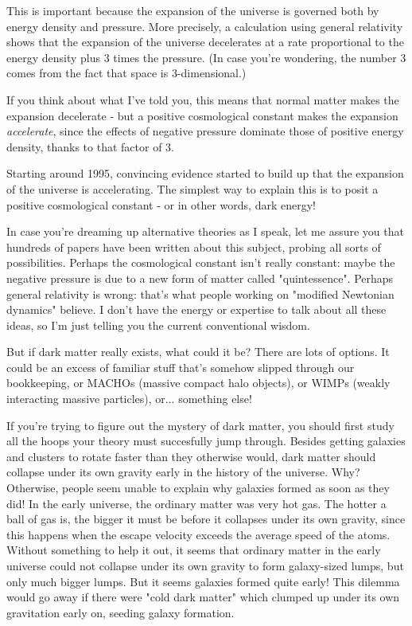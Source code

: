 This is important because the expansion of the universe is governed both
by energy density and pressure.  More precisely, a calculation using
general relativity shows that the expansion of the universe decelerates
at a rate proportional to the energy density plus 3 times the pressure.
(In case you're wondering, the number 3 comes from the fact that space
is 3-dimensional.)

If you think about what I've told you, this means that normal matter
makes the expansion decelerate - but a positive cosmological constant
makes the expansion \emph{accelerate}, since the effects of negative pressure
dominate those of positive energy density, thanks to that factor of 3.  

Starting around 1995, convincing evidence started to build up that the
expansion of the universe is accelerating.  The simplest way to explain
this is to posit a positive cosmological constant - or in other words,
dark energy!  

In case you're dreaming up alternative theories as I speak, let me 
assure you that hundreds of papers have been written about this subject,
probing all sorts of possibilities.  Perhaps the cosmological constant
isn't really constant: maybe the negative pressure is due to a new form
of matter called "quintessence".  Perhaps general relativity is wrong:
that's what people working on "modified Newtonian dynamics" believe.  
I don't have the energy or expertise to talk about all these ideas, so 
I'm just telling you the current conventional wisdom.  

But if dark matter really exists, what could it be? There are lots of
options.  It could be an excess of familiar stuff that's somehow slipped
through our bookkeeping, or MACHOs (massive compact halo objects), or
WIMPs (weakly interacting massive particles), or... something else!

If you're trying to figure out the mystery of dark matter, you should
first study all the hoops your theory must succesfully jump through.
Besides getting galaxies and clusters to rotate faster than they 
otherwise would, dark matter should collapse under its own gravity
early in the history of the universe.  Why?  Otherwise, people seem
unable to explain why galaxies formed as soon as they did!  In the
early universe, the ordinary matter was very hot gas.  The hotter a
ball of gas is, the bigger it must be before it collapses under its 
own gravity, since this happens when the escape velocity exceeds the 
average speed of the atoms.  Without something to help it out, it 
seems that ordinary matter in the early universe could not collapse 
under its own gravity to form galaxy-sized lumps, but only much bigger 
lumps.  But it seems galaxies formed quite early!  This dilemma would 
go away if there were "cold dark matter" which clumped up under its 
own gravitation early on, seeding galaxy formation.

